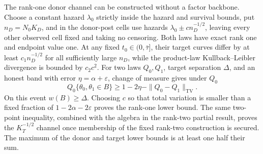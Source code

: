 The rank-one donor channel can be constructed without a factor backbone.  Choose a constant hazard \(\lambda_0\) strictly inside the hazard and survival bounds, put \(n_D=N_0K_D\), and in the donor-post cells use hazards \(\lambda_0\pm c n_D^{-1/2}\), leaving every other observed cell fixed and taking no censoring.  Both laws have exact rank one and endpoint value one.  At any fixed \(t_0\in(0,\bar\tau]\), their target curves differ by at least \(c_1n_D^{-1/2}\) for all sufficiently large \(n_D\), while the product-law Kullback--Leibler divergence is bounded by \(c_2c^2\).  For two laws \(Q_0,Q_1\), target separation \(\Delta\), and an honest band with error \(\eta=\alpha+\varepsilon\), change of measure gives under \(Q_0\)
\[
 Q_0\{\theta_0,\theta_1\in B\}\ge1-2\eta-\|Q_0-Q_1\|_{\mathrm{TV}}.
\]
On this event \(w(B)\ge\Delta\).  Choosing \(c\) so that total variation is smaller than a fixed fraction of \(1-2\alpha-2\varepsilon\) proves the rank-one lower bound.  The same two-point inequality, combined with the algebra in the rank-two partial result, proves the \(K_T^{-1/2}\) channel once membership of the fixed rank-two construction is secured.  The maximum of the donor and target lower bounds is at least one half their sum.